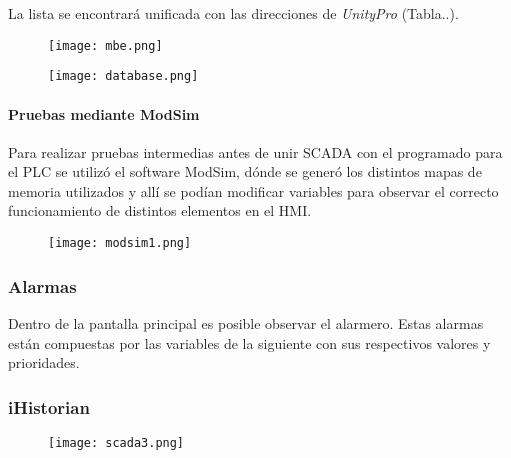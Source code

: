 La lista se encontrará unificada con las direcciones de \textit{UnityPro} (Tabla..).

\begin{figure}[h]
	\centering
	\texttt{[image: mbe.png]}
	\label{fig:mbe}
\end{figure}
\begin{figure}[h]
	\centering
	\texttt{[image: database.png]}
	\label{fig:database}
\end{figure}


\paragraph{Pruebas mediante ModSim}
Para realizar pruebas intermedias antes de unir SCADA con el programado para el PLC se utilizó el software ModSim, dónde se generó los distintos mapas de memoria utilizados y allí se podían modificar variables para observar el correcto funcionamiento de distintos elementos en el HMI.

\begin{figure}[htb]
	\centering
	\texttt{[image: modsim1.png]}
	\label{fig:modsim1}
\end{figure}



\subsubsection{Alarmas}
Dentro de la pantalla principal es posible observar el alarmero. Estas alarmas están compuestas por las variables de la siguiente  con sus respectivos valores y prioridades.\\
\subsubsection{iHistorian}
\begin{figure}[htb]
	\centering
	\texttt{[image: scada3.png]}
	\label{fig:scada3}
\end{figure}

